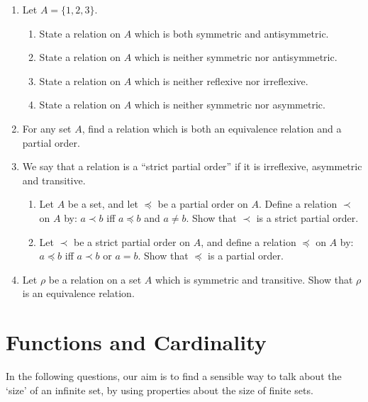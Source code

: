 \documentclass[a4paper,12pt]{article}
\begin{document}
\begin{enumerate}
\item Let $A = \{1,2,3\}$.
\begin{enumerate}
\item State a relation on $A$ which is both symmetric and antisymmetric.
\item State a relation on $A$ which is neither symmetric nor antisymmetric.
\item State a relation on $A$ which is neither reflexive nor irreflexive.
\item State a relation on $A$ which is neither symmetric nor asymmetric.
\end{enumerate}
\item For any set $A$, find a relation which is both an equivalence relation
and a partial order.
\item We say that a relation is a ``strict partial order'' if it is
irreflexive, asymmetric and transitive.
\begin{enumerate}
\item Let $A$ be a set, and let $\preceq$ be a partial order on $A$.
Define a relation $\prec$ on $A$ by: $a \prec b$ iff $a \preceq b$ and
$a \neq b$. Show that $\prec$ is a strict partial order.
\item
Let $\prec$ be a strict partial order on $A$, and define a relation $\preceq$
on $A$ by: $a \preceq b$ iff $a \prec b$ or $a = b$. Show that $\preceq$ is
a partial order.
\end{enumerate}
\item Let $\rho$ be a relation on a set $A$ which is symmetric and transitive.
Show that $\rho$ is an equivalence relation.
\end{enumerate}

\section{Functions and Cardinality}

In the following questions, our aim is to find a sensible way to talk about the
`size' of an infinite set, by using properties about the size of finite sets.
\end{document}
